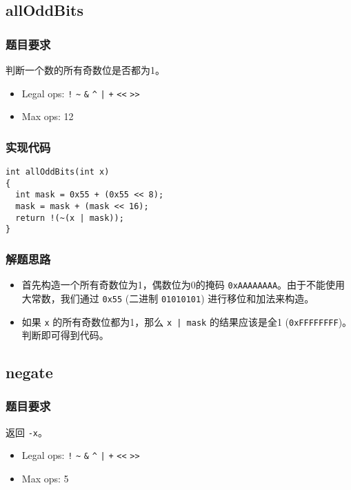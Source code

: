 \documentclass{article}
\begin{document}
\subsection{allOddBits}
\subsubsection{题目要求}
判断一个数的所有奇数位是否都为1。
\begin{itemize}
    \item Legal ops: \texttt{!} \texttt{\~{}} \texttt{\&} \texttt{\^{}} \texttt{|} \texttt{+} \texttt{<<} \texttt{>>}
    \item Max ops: 12
\end{itemize}

\subsubsection{实现代码}
\begin{lstlisting}[caption={allOddBits}]
int allOddBits(int x)
{
  int mask = 0x55 + (0x55 << 8);
  mask = mask + (mask << 16);
  return !(~(x | mask));
}
\end{lstlisting}

\subsubsection{解题思路}
\begin{itemize}
  \item 首先构造一个所有奇数位为1，偶数位为0的掩码 \texttt{0xAAAAAAAA}。由于不能使用大常数，我们通过 \texttt{0x55} (二进制 \texttt{01010101}) 进行移位和加法来构造。
  \item 如果 \texttt{x} 的所有奇数位都为1，那么 \texttt{x | mask} 的结果应该是全1 (\texttt{0xFFFFFFFF})。判断即可得到代码。
\end{itemize}

\subsection{negate}
\subsubsection{题目要求}
返回 \texttt{-x}。
\begin{itemize}
    \item Legal ops: \texttt{!} \texttt{\~{}} \texttt{\&} \texttt{\^{}} \texttt{|} \texttt{+} \texttt{<<} \texttt{>>}
    \item Max ops: 5
\end{itemize}
\end{document}

